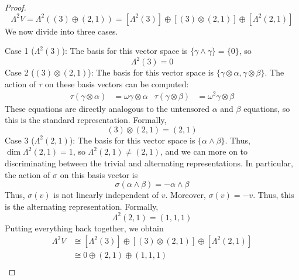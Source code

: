 \documentclass[../psets.tex]{subfiles}
\begin{document}
\begin{enumerate}
\begin{enumerate}
\begin{proof}
            \begin{equation*}
                \Lambda^2V = \Lambda^2((3)\oplus(2,1))
                = [\Lambda^2(3)]\oplus[(3)\otimes(2,1)]\oplus[\Lambda^2(2,1)]
            \end{equation*}
            We now divide into three cases.\par\smallskip
            Case 1 ($\Lambda^2(3)$): The basis for this vector space is $\{\gamma\wedge\gamma\}=\{0\}$, so
            \begin{equation*}
                \Lambda^2(3) = 0
            \end{equation*}
            Case 2 ($(3)\otimes(2,1)$): The basis for this vector space is $\{\gamma\otimes\alpha,\gamma\otimes\beta\}$. The action of $\tau$ on these basis vectors can be computed:
            \begin{align*}
                \tau(\gamma\otimes\alpha) &= \omega\gamma\otimes\alpha&
                \tau(\gamma\otimes\beta) &= \omega^2\gamma\otimes\beta
            \end{align*}
            These equations are directly analogous to the untensored $\alpha$ and $\beta$ equations, so this is the standard representation. Formally,
            \begin{equation*}
                (3)\otimes(2,1) = (2,1)
            \end{equation*}
            Case 3 ($\Lambda^2(2,1)$): The basis for this vector space is $\{\alpha\wedge\beta\}$. Thus, $\dim\Lambda^2(2,1)=1$, so $\Lambda^2(2,1)\neq(2,1)$, and we can more on to discriminating between the trivial and alternating representations. In particular, the action of $\sigma$ on this basis vector is
            \begin{equation*}
                \sigma(\alpha\wedge\beta) = -\alpha\wedge\beta
            \end{equation*}
            Thus, $\sigma(v)$ is not linearly independent of $v$. Moreover, $\sigma(v)=-v$. Thus, this is the alternating representation. Formally,
            \begin{equation*}
                \Lambda^2(2,1) = (1,1,1)
            \end{equation*}
            Putting everything back together, we obtain
            \begin{align*}
                \Lambda^2V &\cong [\Lambda^2(3)]\oplus[(3)\otimes(2,1)]\oplus[\Lambda^2(2,1)]\\
                &\cong 0\oplus(2,1)\oplus(1,1,1)\\

\end{align*}
\end{proof}
\end{enumerate}
\end{enumerate}
\end{document}
